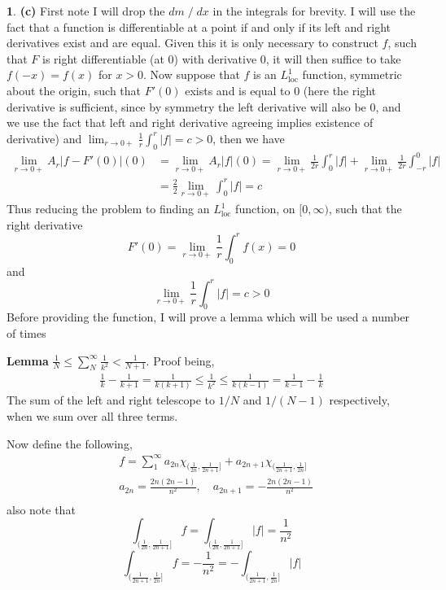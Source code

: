 \documentclass[10.5pt]{article}
\theoremstyle{definition}
\newtheorem{pb}{}
\newcommand{\abs}[1]{\left\vert#1\right\vert}
\begin{document}
\begin{pb}
        \textbf{(c)} First note I will drop the \(dm \; / \; dx\) in the integrals for brevity. I will use the fact that a function is differentiable at a point if and only if its left and right derivatives exist and are equal. Given this it is only necessary to construct \(f\), such that
        \(F\) is right differentiable (at 0) with derivative \(0\), it will then suffice to take
        \(f(-x) = f(x)\) for \(x > 0\). Now suppose that \(f\) is an \(L^1_{\text{loc}}\) function, symmetric about the origin, such that
        \(F'(0)\) exists and is equal to \(0\) (here the right derivative is sufficient, since by symmetry the left derivative will also be \(0\), and we use the fact that left and right derivative agreeing implies existence of derivative)  and \(\lim_{r\to0+}\frac{1}{r}\int_0^r\abs{f} = c > 0\), then we have
        \begin{align*}
            \lim_{r\to0+}A_r\abs{f-F'(0)}(0) &= \lim_{r\to0+}A_r\abs{f}(0) 
            = \lim_{r\to0+}\frac{1}{2r}\int_0^r \abs{f} + \lim_{r\to 0 +}\frac{1}{2r} \int_{-r}^0 \abs{f} \\
            &= \frac22 \lim_{r\to0+} \int_0^r \abs{f} = c
        \end{align*}
        Thus reducing the problem to finding an \(L^1_\text{loc}\) function, on \([0,\infty)\), such that the right derivative
        \[F'(0) = \lim_{r\to0+}\frac{1}{r}\int_0^r f(x) = 0\]
        and
        \[\lim_{r\to0+}\frac{1}{r}\int_0^r\abs{f} = c > 0\]
        Before providing the function, I will prove a lemma which will be used a number of times

        \textbf{Lemma} \(\frac{1}{N} \leq \sum_N^\infty \frac{1}{k^2} < \frac{1}{N+1}\). Proof being,
        \begin{align*}
            \frac{1}{k} - \frac{1}{k+1} = \frac{1}{k(k+1)} \leq \frac{1}{k^2} \leq \frac{1}{k(k-1)} = \frac{1}{k-1} - \frac{1}{k}
        \end{align*}
        The sum of the left and right telescope to \(1/N\) and \(1/(N-1)\) respectively, when we sum over all three terms.

        Now define the following,
        \begin{align*}
            &f = \sum_1^\infty a_{2n}\chi_{(\frac{1}{2n},\frac{1}{2n+1}]} + a_{2n+1}\chi_{(\frac{1}{2n+1},\frac{1}{2n}]} \\
            &a_{2n} = \frac{2n(2n-1)}{n^2}, \quad a_{2n+1} = -\frac{2n(2n-1)}{n^2} \\
        \end{align*}
        also note that 
        \[\int_{(\frac{1}{2n},\frac{1}{2n+1}]} f = \int_{(\frac{1}{2n},\frac{1}{2n+1}]} \abs{f} = \frac{1}{n^2}\]
        \[\int_{(\frac{1}{2n+1},\frac{1}{2n}]} f = -\frac{1}{n^2} = - \int_{(\frac{1}{2n+1},\frac{1}{2n}]}\abs{f}\]


\end{pb}
\end{document}
